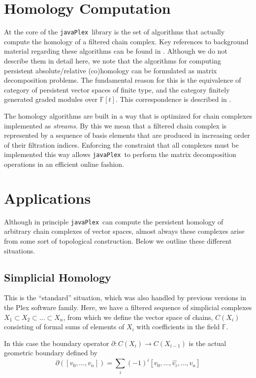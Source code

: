 \documentclass{gts2012}
\newcommand\javaPlex{\texttt{javaPlex}\ }
\begin{document}
\section{Homology Computation}

At the core of the \javaPlex library is the set of algorithms that actually compute the homology of a filtered chain complex. Key references to background material regarding these algorithms can be found in \cite{Carlsson_04, Dualities}. Although we do not describe them in detail here, we note that the algorithms for computing persistent absolute/relative (co)homology can be formulated as matrix decomposition problems. The fundamental reason for this is the equivalence of category of persistent vector spaces of finite type, and the category finitely generated graded modules over $\mathbb{F}[t]$. This correspondence is described in \cite{Carlsson_04}. 

The homology algorithms are built in a way that is optimized for chain complexes implemented as \emph{streams}. By this we mean that a filtered chain complex is represented by a sequence of basis elements that are produced in increasing order of their filtration indices. Enforcing the constraint that all complexes must be implemented this way allows \javaPlex to perform the matrix decomposition operations in an efficient online fashion.

\section{Applications}

Although in principle \javaPlex can compute the persistent homology of arbitrary chain complexes of vector spaces, almost always these complexes arise from some sort of topological construction. Below we outline these different situations.

\subsection{Simplicial Homology}

This is the ``standard'' situation, which was also handled by previous versions in the Plex software family. Here, we have a filtered sequence of simplicial complexes $X_1 \subset X_2 \subset ... \subset X_n$, from which we define the vector space of chains, $C(X_i)$ consisting of formal sums of elements of $X_i$ with coefficients in the field $\mathbb{F}$.

In this case the boundary operator $\partial: C(X_i) \rightarrow C(X_{i-1})$ is the actual geometric boundary defined by
$$\partial([v_0, ..., v_n]) = \sum_i (-1)^i [v_0, ..., \hat{v_i}, ..., v_n]$$
\end{document}
